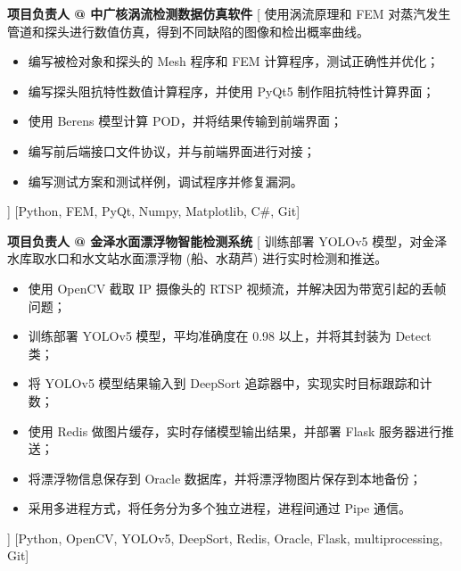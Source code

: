 \begin{experiences}
    {\textbf{项目负责人 @ 中广核涡流检测数据仿真软件}}%
    [
    使用涡流原理和 FEM 对蒸汽发生管道和探头进行数值仿真，得到不同缺陷的图像和检出概率曲线。
        \begin{itemize}
            \item {编写被检对象和探头的 Mesh 程序和 FEM 计算程序，测试正确性并优化；}
            \item {编写探头阻抗特性数值计算程序，并使用 PyQt5 制作阻抗特性计算界面；}
            \item {使用 Berens 模型计算 POD，并将结果传输到前端界面；}
            \item {编写前后端接口文件协议，并与前端界面进行对接；}
            \item {编写测试方案和测试样例，调试程序并修复漏洞。}
        \end{itemize}
    ]
    [Python, FEM, PyQt, Numpy, Matplotlib, C\#, Git]
    \separator{0.5ex}

    {\textbf{项目负责人 @ 金泽水面漂浮物智能检测系统}}%
    [
    训练部署 YOLOv5 模型，对金泽水库取水口和水文站水面漂浮物 (船、水葫芦) 进行实时检测和推送。
        \begin{itemize}
            \item {使用 OpenCV 截取 IP 摄像头的 RTSP 视频流，并解决因为带宽引起的丢帧问题；}
            \item {训练部署 YOLOv5 模型，平均准确度在 0.98 以上，并将其封装为 Detect 类；}
            \item {将 YOLOv5 模型结果输入到 DeepSort 追踪器中，实现实时目标跟踪和计数；}
            \item {使用 Redis 做图片缓存，实时存储模型输出结果，并部署 Flask 服务器进行推送；}
            \item {将漂浮物信息保存到 Oracle 数据库，并将漂浮物图片保存到本地备份；}
            \item {采用多进程方式，将任务分为多个独立进程，进程间通过 Pipe 通信。}
        \end{itemize}]
    [Python, OpenCV, YOLOv5, DeepSort, Redis, Oracle, Flask, multiprocessing, Git]
\end{experiences}